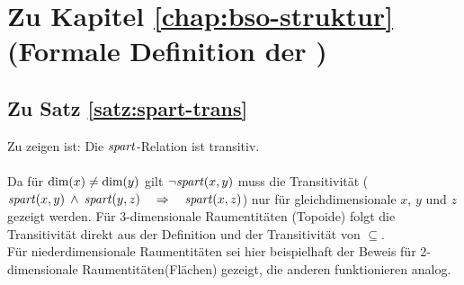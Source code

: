 \section{Zu Kapitel \ref{chap:bso-struktur} (Formale Definition der \strukt)}

\subsection{Zu Satz \ref{satz:spart-trans}}\label{anh:spart-trans}
Zu zeigen ist: Die $\mathit{spart}$-Relation ist transitiv.\\ \ \\
%
Da für $\text{dim}(x) \neq \text{dim}(y)$ gilt $\neg \mathit{spart}(x,y)$ muss die Transitivität ($\mathit{spart}(x,y) \:\land\: \mathit{spart}(y,z) \quad \Rightarrow \quad \mathit{spart}(x,z)$) nur für gleichdimensionale $x$, $y$ und $z$ gezeigt werden.
Für 3-dimensionale Raumentitäten (Topoide) folgt die Transitivität direkt aus der Definition und der Transitivität von \glqq $\subseteq$\grqq .\\
Für niederdimensionale Raumentitäten sei hier beispielhaft der Beweis für 2-dimensionale Raumentitäten(Flächen) gezeigt, die anderen funktionieren analog. \\ \ \\
%
